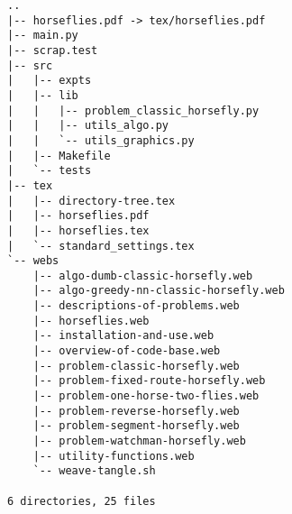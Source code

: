 \begin{verbatim}
..
|-- horseflies.pdf -> tex/horseflies.pdf
|-- main.py
|-- scrap.test
|-- src
|   |-- expts
|   |-- lib
|   |   |-- problem_classic_horsefly.py
|   |   |-- utils_algo.py
|   |   `-- utils_graphics.py
|   |-- Makefile
|   `-- tests
|-- tex
|   |-- directory-tree.tex
|   |-- horseflies.pdf
|   |-- horseflies.tex
|   `-- standard_settings.tex
`-- webs
    |-- algo-dumb-classic-horsefly.web
    |-- algo-greedy-nn-classic-horsefly.web
    |-- descriptions-of-problems.web
    |-- horseflies.web
    |-- installation-and-use.web
    |-- overview-of-code-base.web
    |-- problem-classic-horsefly.web
    |-- problem-fixed-route-horsefly.web
    |-- problem-one-horse-two-flies.web
    |-- problem-reverse-horsefly.web
    |-- problem-segment-horsefly.web
    |-- problem-watchman-horsefly.web
    |-- utility-functions.web
    `-- weave-tangle.sh

6 directories, 25 files
\end{verbatim}
